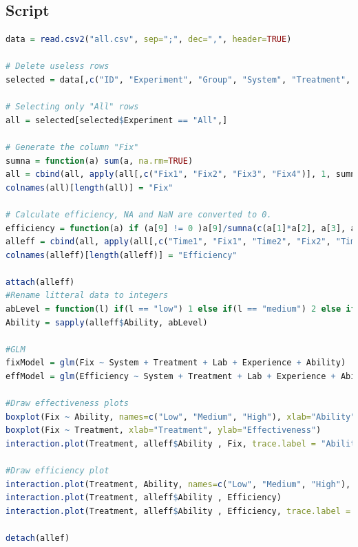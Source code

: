 \subsection{Script} \newpage
\begin{lstlisting}[language=R]
data = read.csv2("all.csv", sep=";", dec=",", header=TRUE)

# Delete useless rows
selected = data[,c("ID", "Experiment", "Group", "System", "Treatment", "Lab", "Experience", "Ability", "Time1", "Fix1", "Time2", "Fix2", "Time3", "Fix3", "Time4", "Fix4")]

# Selecting only "All" rows
all = selected[selected$Experiment == "All",]

# Generate the column "Fix"
sumna = function(a) sum(a, na.rm=TRUE)
all = cbind(all, apply(all[,c("Fix1", "Fix2", "Fix3", "Fix4")], 1, sumna)) 
colnames(all)[length(all)] = "Fix"

# Calculate efficiency, NA and NaN are converted to 0.
efficiency = function(a) if (a[9] != 0 )a[9]/sumna(c(a[1]*a[2], a[3], a[4], a[5]*a[6], a[7]*a[8])) else 0
alleff = cbind(all, apply(all[,c("Time1", "Fix1", "Time2", "Fix2", "Time3", "Fix3", "Time4", "Fix4", "Fix")], 1, efficiency)) 
colnames(alleff)[length(alleff)] = "Efficiency"

attach(alleff)
#Rename litteral data to integers 
abLevel = function(l) if(l == "low") 1 else if(l == "medium") 2 else if(l == "high") 3
Ability = sapply(alleff$Ability, abLevel)

#GLM
fixModel = glm(Fix ~ System + Treatment + Lab + Experience + Ability)
effModel = glm(Efficiency ~ System + Treatment + Lab + Experience + Ability)

#Draw effectiveness plots
boxplot(Fix ~ Ability, names=c("Low", "Medium", "High"), xlab="Ability", ylab="Effectiveness")
boxplot(Fix ~ Treatment, xlab="Treatment", ylab="Effectiveness")
interaction.plot(Treatment, alleff$Ability , Fix, trace.label = "Ability")

#Draw efficiency plot
interaction.plot(Treatment, Ability, names=c("Low", "Medium", "High"), Efficiency)
interaction.plot(Treatment, alleff$Ability , Efficiency)
interaction.plot(Treatment, alleff$Ability , Efficiency, trace.label = "Ability")

detach(allef)

\end{lstlisting}
	
\newpage

